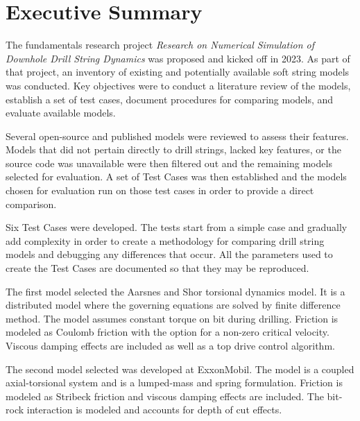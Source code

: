 \chapter*{Executive Summary}

The fundamentals research project \emph{Research on Numerical Simulation of Downhole Drill String Dynamics} was proposed and kicked off in 2023.  As part of that project, an inventory of existing and potentially available soft string models was conducted.  Key objectives were to conduct a literature review of the models, establish a set of test cases, document procedures for comparing models, and evaluate available models.

Several open-source and published models were reviewed to assess their features.  Models that did not pertain directly to drill strings, lacked key features, or the source code was unavailable were then filtered out and the remaining models selected for evaluation.  A set of Test Cases was then established and the models chosen for evaluation run on those test cases in order to provide a direct comparison.

Six Test Cases were developed.  The tests start from a simple case and gradually add complexity in order to create a methodology for comparing drill string models and debugging any differences that occur.  All the parameters used to create the Test Cases are documented so that they may be reproduced.

The first model selected the Aarsnes and Shor torsional dynamics model. It is a distributed model where the governing equations are solved by finite difference method. The model assumes constant torque on bit during drilling.  Friction is modeled as Coulomb friction with the option for a non-zero critical velocity.  Viscous damping effects are included as well as a top drive control algorithm.

The second model selected was developed at ExxonMobil. The model is a coupled axial-torsional system and is a lumped-mass and spring formulation. Friction is modeled as Stribeck friction and viscous damping effects are included.  The bit-rock interaction is modeled and accounts for depth of cut effects.


